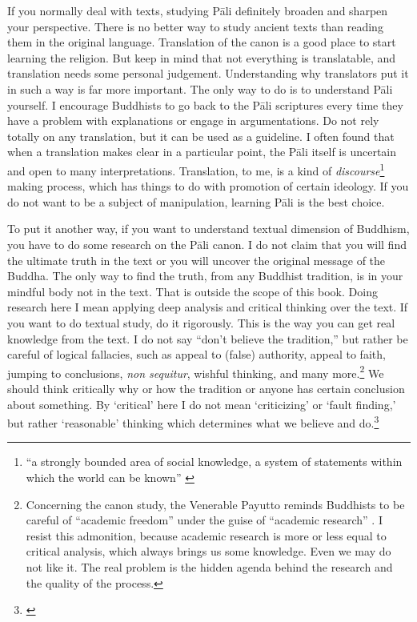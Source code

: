 If you normally deal with texts, studying P\=ali definitely broaden and sharpen your perspective. There is no better way to study ancient texts than reading them in the original language. Translation of the canon is a good place to start learning the religion. But keep in mind that not everything is translatable, and translation needs some personal judgement. Understanding why translators put it in such a way is far more important. The only way to do is to understand P\=ali yourself. I encourage Buddhists to go back to the P\=ali scriptures every time they have a problem with explanations or engage in argumentations. Do not rely totally on any translation, but it can be used as a guideline. I often found that when a translation makes clear in a particular point, the P\=ali itself is uncertain and open to many interpretations. Translation, to me, is a kind of \emph{discourse}\footnote{``a strongly bounded area of social knowledge, a system of statements within which the world can be known'' \citep[p.~83]{ashcroft:postcolonial}} making process, which has things to do with promotion of certain ideology. If you do not want to be a subject of manipulation, learning P\=ali is the best choice.

To put it another way, if you want to understand textual dimension of Buddhism, you have to do some research on the P\=ali canon. I do not claim that you will find the ultimate truth in the text or you will uncover the original message of the Buddha. The only way to find the truth, from any Buddhist tradition, is in your mindful body not in the text. That is outside the scope of this book. Doing research here I mean applying deep analysis and critical thinking over the text. If you want to do textual study, do it rigorously. This is the way you can get real knowledge from the text. I do not say ``don't believe the tradition,'' but rather be careful of logical fallacies, such as appeal to (false) authority, appeal to faith, jumping to conclusions, \textit{non sequitur}, wishful thinking, and many more.\footnote{Concerning the canon study, the Venerable Payutto reminds Buddhists to be careful of ``academic freedom'' under the guise of ``academic research'' \citep[p.~68]{payutto:canon}. I resist this admonition, because academic research is more or less equal to critical analysis, which always brings us some knowledge. Even we may do not like it. The real problem is the hidden agenda behind the research and the quality of the process.} We should think critically why or how the tradition or anyone has certain conclusion about something. By `critical' here I do not mean `criticizing' or `fault finding,' but rather `reasonable' thinking which determines what we believe and do.\footnote{\citealp[p.~32]{ennis:critical}}

